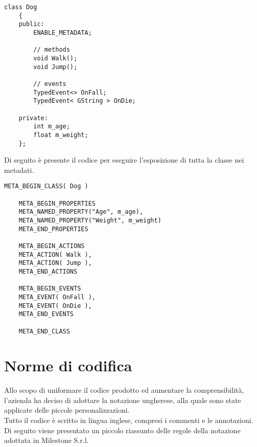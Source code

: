 \newpage

\begin{lstlisting}[style=maurizio-code]
	class Dog
	{
	public:
		ENABLE_METADATA;

		// methods
		void Walk();
		void Jump();

		// events
		TypedEvent<> OnFall;
		TypedEvent< GString > OnDie;

	private:
		int m_age;
		float m_weight;
	};
\end{lstlisting}

Di seguito è presente il codice per eseguire l'esposizione di tutta la classe nei metadati.

\begin{lstlisting}[style=maurizio-code]
	META_BEGIN_CLASS( Dog )
	
	META_BEGIN_PROPERTIES
	META_NAMED_PROPERTY("Age", m_age),
	META_NAMED_PROPERTY("Weight", m_weight)
	META_END_PROPERTIES
	
	META_BEGIN_ACTIONS
	META_ACTION( Walk ),
	META_ACTION( Jump ),
	META_END_ACTIONS
	
	META_BEGIN_EVENTS
	META_EVENT( OnFall ),
	META_EVENT( OnDie ),
	META_END_EVENTS
	
	META_END_CLASS
\end{lstlisting}

\section{Norme di codifica}

Allo scopo di uniformare il codice prodotto ed aumentare la comprensibilità, l'azienda ha deciso di adottare la notazione ungherese, alla quale sono state applicate delle piccole personalizzazioni.\\

Tutto il codice è scritto in lingua inglese, compresi i commenti e le annotazioni. Di seguito viene presentato un piccolo riassunto delle regole della notazione adottata in Milestone S.r.l.\\

